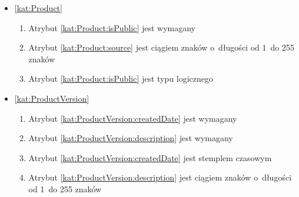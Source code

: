 \begin{itemize}[label={\textbf{Ograniczenia dla}}, wide, labelwidth=!, labelindent=0pt]
%
%

    \item\ref{kat:Product}
    \begin{enumerate}[label={\textbf{OGR/\protect\threedigits{\arabic{enumi}}}}, wide, labelwidth=!, align=left, leftmargin=3cm, resume]
        \item Atrybut \ref{kat:Product:isPublic} jest wymagany

        \item Atrybut \ref{kat:Product:source} jest ciągiem znaków o~długości od 1~do 255 znaków
        \item Atrybut \ref{kat:Product:isPublic} jest typu logicznego
    \end{enumerate}

    \item\ref{kat:ProductVersion}
    \begin{enumerate}[label={\textbf{OGR/\protect\threedigits{\arabic{enumi}}}}, wide, labelwidth=!, align=left, leftmargin=3cm, resume]
        \item Atrybut \ref{kat:ProductVersion:createdDate} jest wymagany
        \item Atrybut \ref{kat:ProductVersion:description} jest wymagany

        \item Atrybut \ref{kat:ProductVersion:createdDate} jest stemplem czasowym
        \item Atrybut \ref{kat:ProductVersion:description} jest ciągiem znaków o~długości od 1~do 255 znaków
    \end{enumerate}


\end{itemize}
